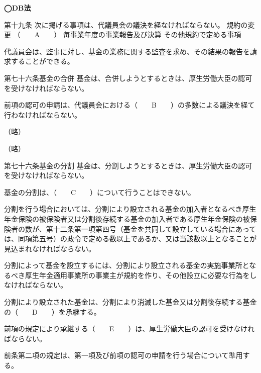 \begin{fillblank}[H29 年金1 問題1(1)]
  \noindent \textbf{◯DB法}
  \begin{lawstructure}
    \begin{lawarticle}{第十九条}{}
      次に掲げる事項は、代議員会の議決を経なければならない。
       規約の変更
       （　　A　　）
       毎事業年度の事業報告及び決算
       その他規約で定める事項

      代議員会は、監事に対し、基金の業務に関する監査を求め、その結果の報告を請求することができる。
    \end{lawarticle}

    \begin{lawarticle}{第七十六条}{基金の合併}
      基金は、合併しようとするときは、厚生労働大臣の認可を受けなければならない。

      前項の認可の申請は、代議員会における（　　B　　）の多数による議決を経て行わなければならない。

      （略）

      （略）
    \end{lawarticle}

    \begin{lawarticle}{第七十六条}{基金の分割}
      基金は、分割しようとするときは、厚生労働大臣の認可を受けなければならない。

      基金の分割は、（　　C　　）について行うことはできない。

      分割を行う場合においては、分割により設立される基金の加入者となるべき厚生年金保険の被保険者又は分割後存続する基金の加入者である厚生年金保険の被保険者の数が、第十二条第一項第四号（基金を共同して設立している場合にあっては、同項第五号）の政令で定める数以上であるか、又は当該数以上となることが見込まれなければならない。

      分割によって基金を設立するには、分割により設立される基金の実施事業所となるべき厚生年金適用事業所の事業主が規約を作り、その他設立に必要な行為をしなければならない。
      
      分割により設立された基金は、分割により消滅した基金又は分割後存続する基金の（　　D　　）を承継する。

      前項の規定により承継する（　　E　　）は、厚生労働大臣の認可を受けなければならない。

      前条第二項の規定は、第一項及び前項の認可の申請を行う場合について準用する。
    
    \end{lawarticle}
  \end{lawstructure}
\end{fillblank}

